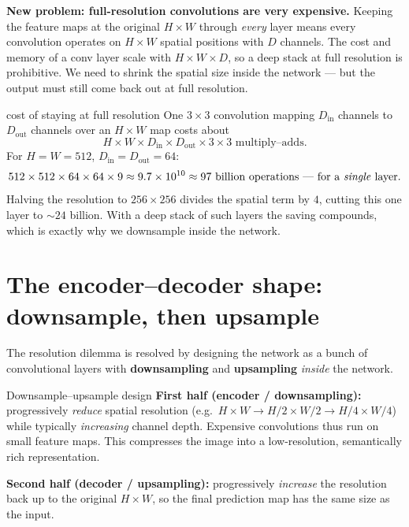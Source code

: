 \documentclass{report}
\begin{document}
\begin{keybox}
\textbf{New problem: full-resolution convolutions are very expensive.} Keeping
the feature maps at the original $H\times W$ through \emph{every} layer means
every convolution operates on $H\times W$ spatial positions with $D$ channels.
The cost and memory of a conv layer scale with $H\times W\times D$, so a deep
stack at full resolution is prohibitive. We need to shrink the spatial size
inside the network --- but the output must still come back out at full
resolution.
\end{keybox}

\begin{exbox}{cost of staying at full resolution}
One $3\times3$ convolution mapping $D_{\text{in}}$ channels to $D_{\text{out}}$
channels over an $H\times W$ map costs about
\[
H \times W \times D_{\text{in}} \times D_{\text{out}} \times 3 \times 3
\text{ multiply--adds.}
\]
For $H=W=512$, $D_{\text{in}}=D_{\text{out}}=64$:
\[
512\times512\times64\times64\times9 \approx 9.7\times10^{10}
\approx 97 \text{ billion operations --- for a \emph{single} layer.}
\]
Halving the resolution to $256\times256$ divides the spatial term by $4$,
cutting this one layer to $\sim24$ billion. With a deep stack of such layers the
saving compounds, which is exactly why we downsample inside the network.
\end{exbox}

\section{The encoder--decoder shape: downsample, then upsample}

The resolution dilemma is resolved by designing the network as a bunch of
convolutional layers with \textbf{downsampling} and \textbf{upsampling}
\emph{inside} the network.

\begin{defbox}{Downsample--upsample design}
\textbf{First half (encoder / downsampling):} progressively \emph{reduce}
spatial resolution (e.g.\ $H\times W \to H/2\times W/2 \to H/4\times W/4$) while
typically \emph{increasing} channel depth. Expensive convolutions thus run on
small feature maps. This compresses the image into a low-resolution, semantically
rich representation.

\medskip
\textbf{Second half (decoder / upsampling):} progressively \emph{increase} the
resolution back up to the original $H\times W$, so the final prediction map has
the same size as the input.
\end{defbox}
\end{document}
